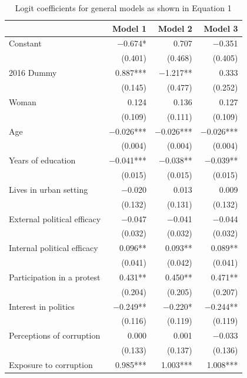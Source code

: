 \documentclass[floatsintext,man]{apa7}\usepackage[]{graphicx}\usepackage[]{color}
\begin{document}
\renewcommand{\arraystretch}{0.6}


\begin{longtable}[t]{lrrr}
\caption{\label{tab:complexmod}Logit coefficients for general models as shown in Equation 1}\\
\toprule
  & Model 1 & Model 2 & Model 3\\
\midrule
Constant & \num{-0.674}* & \num{0.707} & \num{-0.351}\\
 & (\num{0.401}) & (\num{0.468}) & (\num{0.405})\\
2016 Dummy & \num{0.887}*** & \num{-1.217}** & \num{0.333}\\
 & (\num{0.145}) & (\num{0.477}) & (\num{0.252})\\
Woman & \num{0.124} & \num{0.136} & \num{0.127}\\
 & (\num{0.109}) & (\num{0.111}) & (\num{0.109})\\
Age & \num{-0.026}*** & \num{-0.026}*** & \num{-0.026}***\\
 & (\num{0.004}) & (\num{0.004}) & (\num{0.004})\\
Years of education & \num{-0.041}*** & \num{-0.038}** & \num{-0.039}**\\
 & (\num{0.015}) & (\num{0.015}) & (\num{0.015})\\
Lives in urban setting & \num{-0.020} & \num{0.013} & \num{0.009}\\
 & (\num{0.132}) & (\num{0.131}) & (\num{0.132})\\
External political efficacy & \num{-0.047} & \num{-0.041} & \num{-0.044}\\
 & (\num{0.032}) & (\num{0.032}) & (\num{0.032})\\
Internal political efficacy & \num{0.096}** & \num{0.093}** & \num{0.089}**\\
 & (\num{0.041}) & (\num{0.042}) & (\num{0.041})\\
Participation in a protest & \num{0.431}** & \num{0.450}** & \num{0.471}**\\
 & (\num{0.204}) & (\num{0.205}) & (\num{0.207})\\
Interest in politics & \num{-0.249}** & \num{-0.220}* & \num{-0.244}**\\
 & (\num{0.116}) & (\num{0.119}) & (\num{0.119})\\
Perceptions of corruption & \num{0.000} & \num{0.001} & \num{-0.033}\\
 & (\num{0.133}) & (\num{0.137}) & (\num{0.136})\\
Exposure to corruption & \num{0.985}*** & \num{1.003}*** & \num{1.008}***\\

\end{longtable}
\end{document}
